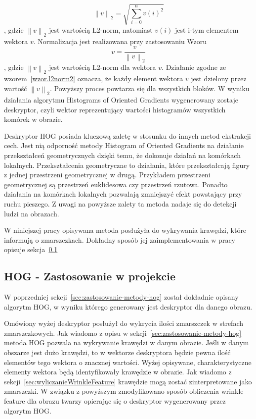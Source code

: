 \documentclass[a4paper,twoside,12pt]{book}
\begin{document}
    \large
    \begin{equation}
        \left \|v  \right \|_{2}=\sqrt{\sum_{i=0}^{n}v(i)^{2}}
        \label{wzor.l2norm}
    \end{equation}
    \normalsize
    , gdzie $\left \|v  \right \|_{2}$ jest wartością L2-norm, natomiast $v(i)$ jest i-tym elementem wektora $v$.
    Normalizacja jest realizowana przy zastosowaniu Wzoru
    \large
    \begin{equation}
        v = \frac{v}{\left \|v  \right \|_{2}}
        \label{wzor.l2norm2}
    \end{equation}
    \normalsize
    , gdzie $\left \|v  \right \|_{2}$ jest wartością L2-norm dla wektora $v$. Działanie zgodne ze
    wzorem~\ref{wzor.l2norm2} oznacza, że każdy element wektora $v$ jest dzielony przez wartość
    $\left \|v  \right\|_{2}$.
    Powyższy proces powtarza się dla wszystkich bloków.
    W wyniku działania algorytmu Histograms of Oriented Gradients wygenerowany zostaje deskryptor, czyli wektor
    reprezentujący wartości histogramów wszystkich komórek w obrazie.

    Deskryptor HOG posiada kluczową zaletę w stosunku do innych metod ekstrakcji cech.
    Jest nią odporność metody Histogram of Oriented Gradients na działanie przekształceń geometrycznych
    dzięki temu, że dokonuje działań na komórkach lokalnych.
    Przekształcenia geometryczne to działania, które przekształcają figury z jednej przestrzeni geometrycznej w drugą.
    Przykładem przestrzeni geometrycznej są przestrzeń euklidesowa czy przestrzeń rzutowa.
    Ponadto działania na komórkach lokalnych pozwalają zmniejszyć efekt powstający przy ruchu pieszego.
    Z uwagi na powyższe zalety ta metoda nadaje się do detekcji ludzi na obrazach.

    W niniejszej pracy opisywana metoda posłużyła do wykrywania krawędzi, które informują o zmarszczkach. Dokładny sposób jej
    zaimplementowania w pracy opisuje sekcja~\ref{subsec:zastosowanie-w-projekcie2}

    \subsection{HOG - Zastosowanie w projekcie}\label{subsec:zastosowanie-w-projekcie2}
    W poprzedniej sekcji~\ref{sec:zastosowanie-metody-hog} został dokładnie opisany algorytm HOG, w wyniku którego
    generowany jest deskryptor dla danego obrazu.

    Omówiony wyżej deskryptor posłużył do wykrycia ilości zmarszczek w strefach zmarszczkowych. Jak wiadomo z opisu w
    sekcji~\ref{sec:zastosowanie-metody-hog} metoda HOG pozwala na wykrywanie krawędzi w danym obrazie. Jeśli w danym
    obszarze jest dużo krawędzi, to w wektorze deskryptora będzie pewna ilość elementów tego wektora o znacznej wartości.
    Wyżej opisywane, charakterystyczne elementy wektora będą identyfikowały krawędzie w obrazie. Jak wiadomo z
    sekcji~\ref{sec:wyliczanieWrinkleFeature} krawędzie mogą zostać zinterpretowane jako zmarszczki.
    W związku z powyższym zmodyfikowano sposób obliczenia wrinkle feature dla obrazu twarzy opierając się o
    deskryptor wygenerowany przez algorytm HOG.
\end{document}
